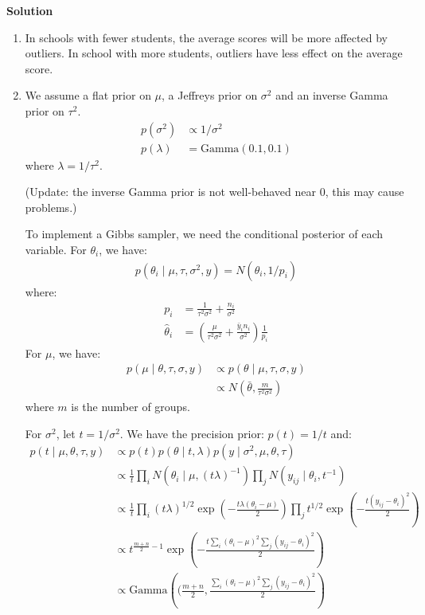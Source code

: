 \documentclass{article}
\begin{document}
\textbf{Solution}
\begin{enumerate}
\item In schools with fewer students, the average scores will be more affected by outliers. In school with more students, outliers have less effect on the average score.
\item 
We assume a flat prior on \(\mu\), a Jeffreys prior on \(\sigma^2\) and an inverse Gamma prior on \(\tau^2\).
\begin{align*}
p(\sigma^2) &\propto 1/\sigma^2\\
p(\lambda)  &= \mbox{Gamma}(0.1, 0.1)
\end{align*}
where \(\lambda = 1 / \tau^2\).

(Update: the inverse Gamma prior is not well-behaved near \(0\), this may cause problems.)

To implement a Gibbs sampler, we need the conditional posterior of each variable. For \(\theta_i\), we have:
\begin{align*}
p(\theta_i \mid \mu, \tau, \sigma^2, y) = N(\hat{\theta_i}, 1/p_i)
\end{align*}
where:
\begin{align*}
p_i &= \frac{1}{\tau^2 \sigma^2} + \frac{n_i}{\sigma^2}\\
\hat{\theta}_i &= \left(\frac{\mu}{\tau^2 \sigma^2} + \frac{\bar{y}_i n_i}{\sigma^2}\right) \frac{1}{p_i}
\end{align*}
For \(\mu\), we have:
\begin{align*}
p(\mu \mid \theta, \tau, \sigma, y) &\propto p(\theta \mid \mu, \tau, \sigma, y)\\
&\propto N(\bar{\theta}, \frac{m}{\tau^2\sigma^2})
\end{align*}
where \(m\) is the number of groups.

For \(\sigma^2\), let \(t = 1/\sigma^2\). We have the precision prior: \(p(t) = 1/t\) and: 
\begin{align*}
p(t \mid \mu, \theta, \tau, y) &\propto p(t) p(\theta \mid t, \lambda)p(y \mid \sigma^2, \mu, \theta, \tau)\\
&\propto \frac{1}{t} \prod_i N(\theta_i \mid \mu, (t\lambda)^{-1}) \prod_j N(y_{ij} \mid \theta_i, t^{-1})\\
&\propto \frac{1}{t} \prod_i (t\lambda)^{1/2} \exp \left(-\frac{t\lambda(\theta_i - \mu)}{2} \right) \prod_j t^{1/2} \exp \left( -\frac{t(y_{ij} - \theta_i)^2}{2} \right)\\
&\propto t^{\frac{m + n}{2} - 1} \exp \left( -\frac{t \sum_i(\theta_i -\mu)^2 \sum_j (y_{ij} - \theta_i)^2}{2} \right)\\
&\propto \mbox{Gamma}\left((\frac{m+n}{2}, \frac{\sum_i(\theta_i -\mu)^2 \sum_j (y_{ij} - \theta_i)^2}{2}\right)
\end{align*}


\end{enumerate}
\end{document}
